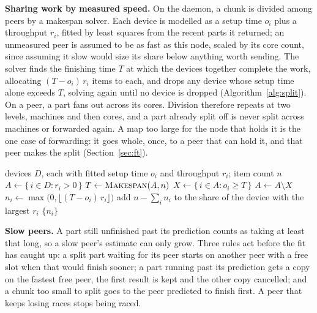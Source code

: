 \textbf{Sharing work by measured speed.} On the daemon, a chunk is divided among
peers by a makespan solver. Each device is modelled as a setup time $o_i$ plus a
throughput $r_i$, fitted by least squares from the recent parts it returned;
an unmeasured peer is assumed to be as fast as this node, scaled by its core
count, since assuming it slow would size its share below anything worth sending.
The solver finds the finishing time $T$ at which the devices together complete
the work, allocating $(T - o_i)\,r_i$ items to each, and drops any device whose
setup time alone exceeds $T$, solving again until no device is dropped
(Algorithm~\ref{alg:split}). On a peer, a part fans out across its cores.
Division therefore repeats at two levels, machines and then cores, and a part
already split off is never split across machines or forwarded again. A map too
large for the node that holds it is the one case of forwarding: it goes whole,
once, to a peer that can hold it, and that peer makes the split
(Section~\ref{sec:ft}).

\begin{algorithm}[!htbp]
\caption{Dividing a chunk of $n$ items among devices by measured speed}
\label{alg:split}
\small
\begin{algorithmic}[1]
\Require devices $D$, each with fitted setup time $o_i$ and throughput $r_i$; item count $n$
\State $A \gets \{\, i \in D : r_i > 0 \,\}$ 
\Repeat
  \State $T \gets \textsc{Makespan}(A, n)$
  \State $X \gets \{\, i \in A : o_i \ge T \,\}$ 
  \State $A \gets A \setminus X$
  \State $n_i \gets \max\bigl(0, \lfloor (T - o_i)\, r_i \rfloor\bigr)$
\EndFor
\State add $n - \sum_i n_i$ to the share of the device with the largest $r_i$
\State \Return $\{n_i\}$
\Statex {}
\end{algorithmic}
\end{algorithm}

\textbf{Slow peers.} A part still unfinished past its prediction counts as taking
at least that long, so a slow peer's estimate can only grow. Three rules act
before the fit has caught up: a split part waiting for its peer starts on another
peer with a free slot when that would finish sooner; a part running past its
prediction gets a copy on the fastest free peer, the first result is kept and the
other copy cancelled; and a chunk too small to split goes to the peer predicted to
finish first. A peer that keeps losing races stops being raced.


